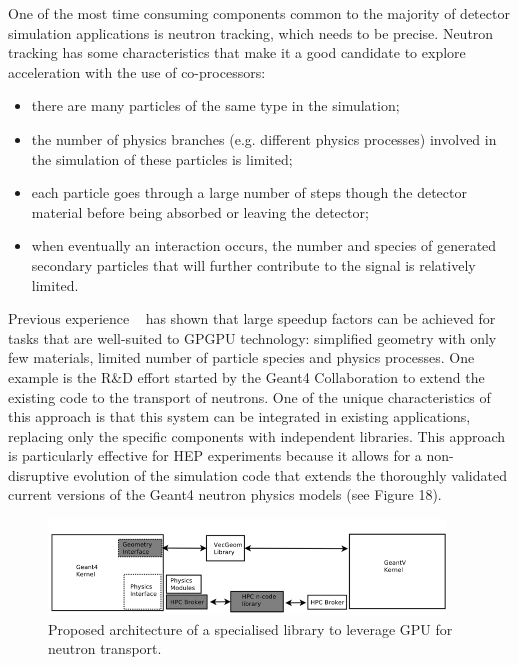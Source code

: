 \documentclass[12pt,a4paper]{article}
\begin{document}
{One of the most time consuming components common to the majority of
detector simulation applications is neutron tracking, which needs to be
precise. Neutron tracking has some characteristics that make it a good
candidate to explore acceleration with the use of co-processors:

\begin{itemize}
\item
  there are many particles of the same type in the simulation;
\item
  the number of physics branches (e.g. different physics processes)
  involved in the simulation of these particles is limited;
\item
  each particle goes through a large number of steps though the detector
  material before being absorbed or leaving the detector;
\item
  when eventually an interaction occurs, the number and species of
  generated secondary particles that will further contribute to the
  signal is relatively limited.
\end{itemize}

Previous experience ~\cite{refId0} has shown that large speedup factors can be
achieved for tasks that are well-suited to GPGPU technology: simplified
geometry with only few materials, limited number of particle species and
physics processes. One example is the R\&D effort started by the Geant4
Collaboration to extend the existing code to the transport of neutrons.
One of the unique characteristics of this approach is that this system
can be integrated in existing applications, replacing only the specific
components with independent libraries. This approach is particularly
effective for HEP experiments because it allows for a non-disruptive
evolution of the simulation code that extends the thoroughly validated
current versions of the Geant4 neutron physics models (see Figure 18).

\begin{figure}[bthp]
\vspace*{0.3cm}
\centering
\includegraphics[width=0.94\textwidth]{image23.png}
\caption{Proposed architecture of a specialised library to
leverage GPU for neutron transport.}
\label{fig:neutrontransport}
\end{figure}

}
\end{document}
